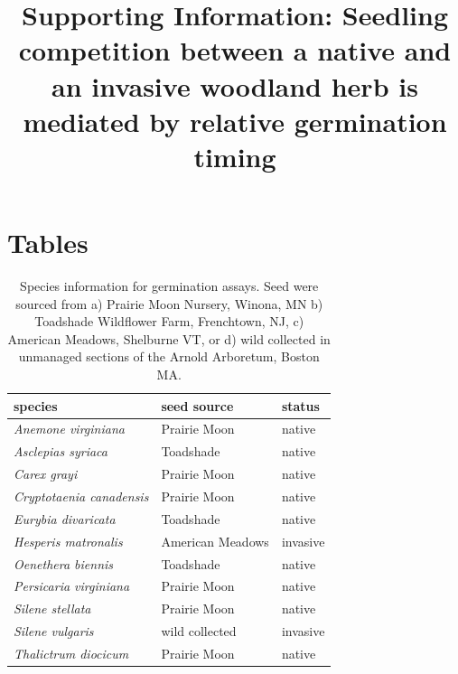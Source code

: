 \documentclass{article}
\title{Supporting Information: Seedling competition between a native %
and an invasive %
woodland herb is mediated by relative germination timing}
\date{}
\begin{document}



\maketitle
\section*{Tables}

\begin{table}[hp]
\centering
\begin{tabular}{|l|l|l|}
\hline
species & seed source & status  \\
\hline
\textit{Anemone virginiana} & Prairie Moon & native  \\
\textit{Asclepias syriaca} & Toadshade & native  \\
\textit{Carex grayi} & Prairie Moon & native  \\
\textit{Cryptotaenia canadensis} & Prairie Moon & native  \\
\textit{Eurybia divaricata} & Toadshade & native  \\
\textit{Hesperis matronalis} & American Meadows & invasive  \\
\textit{Oenethera biennis} & Toadshade & native  \\
\textit{Persicaria virginiana} & Prairie Moon & native  \\
\textit{Silene stellata} & Prairie Moon & native  \\
\textit{Silene vulgaris} & wild collected & invasive  \\
\textit{Thalictrum diocicum} & Prairie Moon & native  \\
\hline
\end{tabular}
\caption{Species information for germination assays. Seed were sourced from a) Prairie Moon Nursery, Winona, MN b) Toadshade Wildflower Farm, Frenchtown, NJ, c) American Meadows, Shelburne VT, or d) wild collected in unmanaged sections of the Arnold Arboretum, Boston MA. }
\label{tab:specs}
\end{table}
\end{document}
